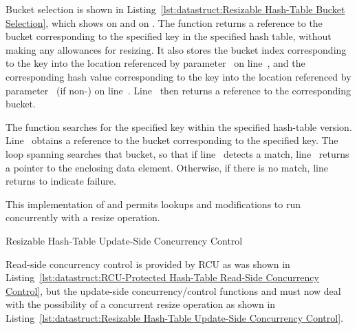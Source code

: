 \begin{fcvref}
Bucket selection is shown in
Listing~\ref{lst:datastruct:Resizable Hash-Table Bucket Selection},
which shows  on
 and  on
.
The  function returns a reference to the bucket
corresponding to the specified key in the specified hash table, without
making any allowances for resizing.
It also stores the bucket index corresponding to the key into the location
referenced by parameter~ on
line~, and the corresponding
hash value corresponding to the key into the location
referenced by parameter~ (if non-) on line~.
Line~ then returns a reference to the corresponding bucket.

The  function searches for the specified key
within the specified hash-table version.
Line~ obtains a reference to the bucket corresponding
to the specified key.
The loop spanning  searches
that bucket, so that if line~ detects a match,
line~ returns a pointer to the enclosing data element.
Otherwise, if there is no match,
line~ returns  to indicate
failure.
\end{fcvref}

\QuickQuizEnd

This implementation of  and 
permits lookups and modifications to run concurrently with a resize
operation.

\begin{listing}

\caption{Resizable Hash-Table Update-Side Concurrency Control}
\label{lst:datastruct:Resizable Hash-Table Update-Side Concurrency Control}
\end{listing}

Read-side concurrency control is provided by RCU as was shown in
Listing~\ref{lst:datastruct:RCU-Protected Hash-Table Read-Side Concurrency Control},
but the update-side concurrency\-/control functions
 and 
must now deal with the possibility of a
concurrent resize operation as shown in
Listing~\ref{lst:datastruct:Resizable Hash-Table Update-Side Concurrency Control}.

